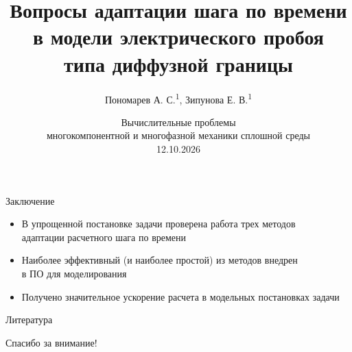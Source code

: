 \documentclass[aspectratio=169]{beamer}
\title[Адаптация шага по времени]{\LARGE Вопросы адаптации шага по времени \\ в модели электрического пробоя \\ типа диффузной границы}
\author[]{
	Пономарев А. С.\textsuperscript{1}, Зипунова Е. В.\textsuperscript{1}
}
\institute[ИПМ им. М. В. Келдыша]{
	\textsuperscript{1}ИПМ им. М. В. Келдыша РАН
}
\date[Сочи, Сириус]{
	Вычислительные проблемы \\ многокомпонентной и многофазной механики сплошной среды \\[2mm]
	12.10.2026
}
\newcommand{\nologo}{\setbeamertemplate{logo}{}}
\begin{document}

\begin{frame}
\titlepage
\end{frame}












\begin{frame}{Заключение}
\large
\begin{itemize}
    \setlength\itemsep{3mm}
	\item В упрощенной постановке задачи проверена работа трех методов \\ адаптации расчетного шага по времени
	\item Наиболее эффективный (и наиболее простой) из методов внедрен \\ в ПО для моделирования
	\item Получено значительное ускорение расчета в модельных постановках задачи
\end{itemize}
\end{frame}

{
\nologo
\begin{frame}{Литература}
\vspace{-2mm}
\printbibliography
\end{frame}
}

\begin{frame}{}
\begin{center}
	\LARGE
	\vspace{4mm}
	Спасибо за внимание!
\end{center}
\end{frame}
\end{document}
